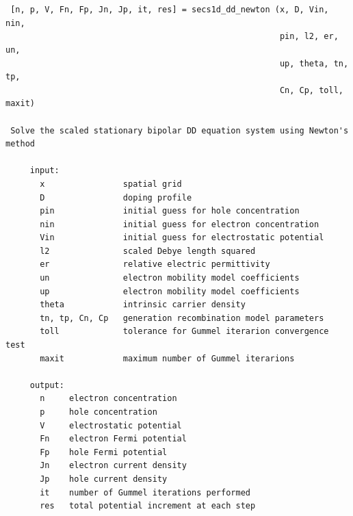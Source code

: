 \begin{verbatim}


 [n, p, V, Fn, Fp, Jn, Jp, it, res] = secs1d_dd_newton (x, D, Vin, nin, 
                                                        pin, l2, er, un, 
                                                        up, theta, tn, tp, 
                                                        Cn, Cp, toll, maxit)

 Solve the scaled stationary bipolar DD equation system using Newton's method

     input: 
       x                spatial grid
       D                doping profile
       pin              initial guess for hole concentration
       nin              initial guess for electron concentration
       Vin              initial guess for electrostatic potential
       l2               scaled Debye length squared
       er               relative electric permittivity
       un               electron mobility model coefficients
       up               electron mobility model coefficients
       theta            intrinsic carrier density
       tn, tp, Cn, Cp   generation recombination model parameters
       toll             tolerance for Gummel iterarion convergence test
       maxit            maximum number of Gummel iterarions

     output: 
       n     electron concentration
       p     hole concentration
       V     electrostatic potential
       Fn    electron Fermi potential
       Fp    hole Fermi potential
       Jn    electron current density
       Jp    hole current density
       it    number of Gummel iterations performed
       res   total potential increment at each step


\end{verbatim}





